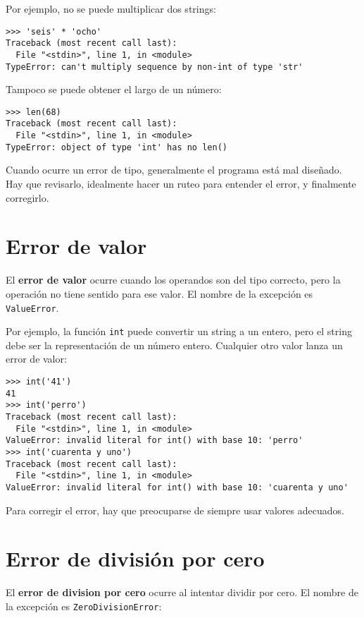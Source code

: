 Por ejemplo, no se puede multiplicar dos strings:

\begin{lstlisting}[language={}]
>>> 'seis' * 'ocho'
Traceback (most recent call last):
  File "<stdin>", line 1, in <module>
TypeError: can't multiply sequence by non-int of type 'str'
\end{lstlisting}

Tampoco se puede obtener el largo de un número:

\begin{lstlisting}[language={}]
>>> len(68)
Traceback (most recent call last):
  File "<stdin>", line 1, in <module>
TypeError: object of type 'int' has no len()
\end{lstlisting}

Cuando ocurre un error de tipo, generalmente el programa está mal
diseñado. Hay que revisarlo, idealmente hacer un ruteo para entender el
error, y finalmente corregirlo.

\section{Error de valor}

El \textbf{error de valor} ocurre cuando los operandos son del tipo
correcto, pero la operación no tiene sentido para ese valor.
El nombre de la excepción es \lstinline!ValueError!.

Por ejemplo, la función \lstinline!int! puede convertir un string a un
entero, pero el string debe ser la representación de un número entero.
Cualquier otro valor lanza un error de valor:

\begin{lstlisting}[language={}]
>>> int('41')
41
>>> int('perro')
Traceback (most recent call last):
  File "<stdin>", line 1, in <module>
ValueError: invalid literal for int() with base 10: 'perro'
>>> int('cuarenta y uno')
Traceback (most recent call last):
  File "<stdin>", line 1, in <module>
ValueError: invalid literal for int() with base 10: 'cuarenta y uno'
\end{lstlisting}

Para corregir el error, hay que preocuparse de siempre usar valores
adecuados.

\section{Error de división por cero}

El \textbf{error de division por cero} ocurre al intentar dividir por cero.
El nombre de la excepción es \lstinline!ZeroDivisionError!:

